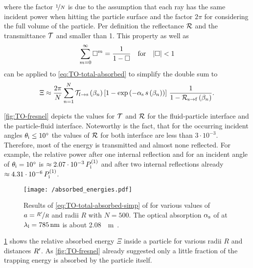 where the factor $\nicefrac{1}{N}$ is due to the assumption that each ray has 
the same incident power when hitting the particle surface and the factor $2\pi$ 
for considering the full volume of the particle. Per definition the reflectance 
$\mathcal{R}$ and the transmittance $\mathcal{T}$ and smaller than 1. This property 
as well as
\begin{equation}
  \sum\limits^{\infty}_{m=0} \Box^{m} = \frac{1}{1-\Box}
  \quad\text{for}\quad\abs{\Box} < 1
\end{equation}
can be applied to \cref{eq:TO-total-absorbed} to simplify the double sum to
\begin{equation}
  \Xi \approx
  \frac{2\pi}{N}
  \sum\limits_{n=1}^{N}
  \mathcal{T}_{\mathrm{f}\rightarrow\mathrm{s}}\left( \beta_{n} \right)
  \left[ 1 - \exp\left( -\alpha_{\mathrm{s}}\,s\left( \beta_{n} \right) \right) 
  \right]
  \,\frac{1}{1-\mathcal{R}_{\mathrm{s}\rightarrow\mathrm{f}}\left( \beta_{n} \right)}.
  \label{eq:TO-total-absorbed-simp}
\end{equation}

\cref{fig:TO-fresnel} depicts the values for $\mathcal{T}$ and $\mathcal{R}$ for 
the fluid-particle interface and the particle-fluid interface. Noteworthy is 
the fact, that for the occurring incident angles $\theta_{\mathrm{i}} \leq 
\SI{10}{\degree}$ the values of $\mathcal{R}$ for both interface are less than 
$3\cdot 10^{-3}$. Therefore, most of the energy is transmitted and almost none 
reflected. For example, the relative power after one internal reflection and 
for an incident angle of $\theta_{\mathrm{i}}=\SI{10}{\degree}$ is $\approx 2.07\cdot 
10^{-3}\,P_{\mathrm{i}}^{(1)}$ and after two internal reflections already $\approx 
4.31\cdot 10^{-6}\,P_{\mathrm{i}}^{(1)}$.

\begin{figure}[tbp]
  \centering
  \texttt{[image: /absorbed\_energies.pdf]}
  \caption{Results of \cref{eq:TO-total-absorbed-simp} of \SiO for various 
  values of $a=\nicefrac{R^{\prime}}{R}$ and radii $R$ with $N=500$. The optical 
absorption $\alpha_{\mathrm{s}}$ of \SiO at $\lal=\SI{785}{\nm}$ is about 
\SI{2.08}{\per\meter}~\cite{Kitamura2007}.}
  \label{fig:TO-absorbed_energies}
\end{figure}

\cref{fig:TO-absorbed_energies} shows the relative absorbed energy $\Xi$ inside 
a particle for various radii $R$ and distances $R^{\prime}$. As 
\cref{fig:TO-fresnel} already suggested only a little fraction of the trapping 
energy is absorbed by the particle itself.

